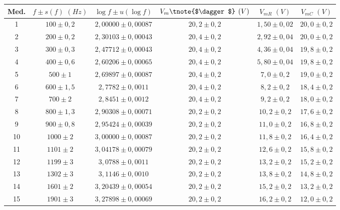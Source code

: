 \documentclass[11pt]{report}
\begin{document}
\begin{refsection}
\begin{table}[H]
\centering
\begin{threeparttable}
\begin{tabular}{|c|c|c|c|c|c|}
\hline
Med. & $f \pm s(f)\hspace{4pt} (Hz)$ & $\log f \pm u(\log f)$ & $V_m\tnote{$\dagger$} \hspace{4pt}(V)$ & $V_{mR}\hspace{4pt} (V)$ 
& $V_{mC}\hspace{4pt}(V)$ \\
\hline
1 & $100 \pm 0,2$ & $2,00000 \pm 0,00087$ & $20,2 \pm 0,2$ & $1,50 \pm 0,02$ & $20,0 \pm 0,2$ \\
2 & $200 \pm 0,2$ & $2,30103 \pm 0,00043$ & $20,4 \pm 0,2$ & $2,92 \pm 0,04$ & $20,0 \pm 0,2$ \\
3 & $300 \pm 0,3$ & $2,47712 \pm 0,00043$ & $20,4 \pm 0,2$ & $4,36 \pm 0,04$ & $19,8 \pm 0,2$ \\
4 & $400 \pm 0,6$ & $2,60206 \pm 0,00065$ & $20,4 \pm 0,2$ & $5,80 \pm 0,04$ & $19,8 \pm 0,2$ \\
5 & $500 \pm 1$ & $2,69897 \pm 0,00087$ & $20,4 \pm 0,2$ & $7,0 \pm 0,2$ & $19,0 \pm 0,2$ \\
6 & $600 \pm 1,5$ & $2,7782 \pm 0,0011$  & $20,4 \pm 0,2$ & $8,2 \pm 0,2$ & $18,4 \pm 0,2$ \\
7 & $700 \pm 2$ & $2,8451 \pm 0,0012$ & $20,4 \pm 0,2$ & $9,2 \pm 0,2$ & $18,0 \pm 0,2$ \\
8 & $800 \pm 1,3$ & $2,90308 \pm 0,00071$ & $20,2 \pm 0,2$ & $10,2 \pm 0,2$ & $17,6 \pm 0,2$ \\
9 & $900 \pm 0,8$ & $2,95424 \pm 0,00039$ & $20,2 \pm 0,2$ & $11,0 \pm 0,2$ & $16,8 \pm 0,2$ \\
10 & $1000 \pm 2$ & $3,00000 \pm 0,00087$ & $20,2 \pm 0,2$ & $11,8 \pm 0,2$ & $16,4 \pm 0,2$ \\
11 & $1101 \pm 2$ & $3,04178 \pm 0,00079$ & $20,2 \pm 0,2$ & $12,6 \pm 0,2$ & $15,8 \pm 0,2$ \\
12 & $1199 \pm 3$ & $3,0788 \pm 0,0011$ & $20,2 \pm 0,2$ & $13,2 \pm 0,2$ & $15,2 \pm 0,2$ \\
13 & $1302 \pm 3$ & $3,1146 \pm 0,0010$ & $20,2 \pm 0,2$ & $13,8 \pm 0,2$ & $14,8 \pm 0,2$ \\
14 & $1601 \pm 2$ & $3,20439 \pm 0,00054$ & $20,2 \pm 0,2$ & $15,2 \pm 0,2$ & $13,2 \pm 0,2$ \\
15 & $1901 \pm 3$ & $3,27898 \pm 0,00069$ & $20,2 \pm 0,2$ & $16,2 \pm 0,2$ & $12,0 \pm 0,2$ \\

\end{tabular}
\end{threeparttable}
\end{table}
\end{refsection}
\end{document}
